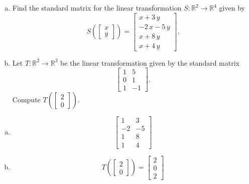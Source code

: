 
\begin{exerciseStatement}

\begin{enumerate}[(a)]
\item Find the standard matrix for the linear transformation \(S:\mathbb{R}^ 2  \to \mathbb{R}^ 4 \) given by \[S\left(  \left[\begin{array}{c}
x \\
y
\end{array}\right]  \right) =  \left[\begin{array}{c}
x + 3 \, y \\
-2 \, x - 5 \, y \\
x + 8 \, y \\
x + 4 \, y
\end{array}\right] .\]
\item Let \(T:\mathbb{R}^ 2  \to \mathbb{R}^ 3 \) be the linear transformation given by the standard matrix \[ \left[\begin{array}{cc}
1 & 5 \\
0 & 1 \\
1 & -1
\end{array}\right] .\] Compute \(T\left( \left[\begin{array}{c}
2 \\
0
\end{array}\right]  \right)\). 
\end{enumerate}
    
\end{exerciseStatement}
    
\begin{exerciseAnswer} 

\begin{enumerate}[(a)]
\item \[ \left[\begin{array}{cc}
1 & 3 \\
-2 & -5 \\
1 & 8 \\
1 & 4
\end{array}\right] \]
\item \[T\left( \left[\begin{array}{c}
2 \\
0
\end{array}\right]  \right)= \left[\begin{array}{c}
2 \\
0 \\
2
\end{array}\right] \]
\end{enumerate}
    
\end{exerciseAnswer}
    
